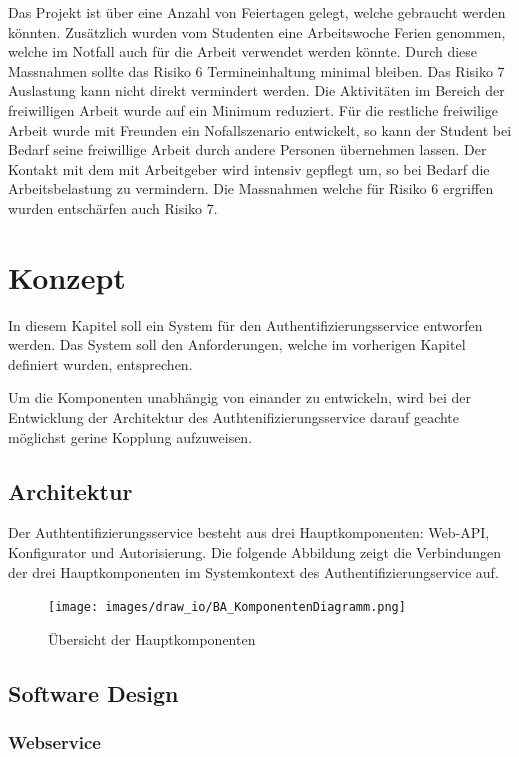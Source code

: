 Das Projekt ist über eine Anzahl von Feiertagen gelegt, welche gebraucht
werden könnten. Zusätzlich wurden vom Studenten eine Arbeitswoche Ferien
genommen, welche im Notfall auch für die Arbeit verwendet werden könnte.
Durch diese Massnahmen sollte das Risiko 6 Termineinhaltung minimal
bleiben. Das Risiko 7 Auslastung kann nicht direkt vermindert werden.
Die Aktivitäten im Bereich der freiwilligen Arbeit wurde auf ein Minimum
reduziert. Für die restliche freiwilige Arbeit wurde mit Freunden ein
Nofallszenario entwickelt, so kann der Student bei Bedarf seine
freiwillige Arbeit durch andere Personen übernehmen lassen. Der Kontakt
mit dem mit Arbeitgeber wird intensiv gepflegt um, so bei Bedarf die
Arbeitsbelastung zu vermindern. Die Massnahmen welche für Risiko 6
ergriffen wurden entschärfen auch Risiko 7.

\chapter{Konzept}\label{konzept}

In diesem Kapitel soll ein System für den Authentifizierungsservice
entworfen werden. Das System soll den Anforderungen, welche im
vorherigen Kapitel definiert wurden, entsprechen.

Um die Komponenten unabhängig von einander zu entwickeln, wird bei der
Entwicklung der Architektur des Authtenifizierungsservice darauf geachte
möglichst gerine Kopplung aufzuweisen.

\section{Architektur}\label{architektur}

Der Authtentifizierungsservice besteht aus drei Hauptkomponenten:
Web-API, Konfigurator und Autorisierung. Die folgende Abbildung zeigt
die Verbindungen der drei Hauptkomponenten im Systemkontext des
Authentifizierungservice auf.

\begin{figure}[htbp]
\centering
\texttt{[image: images/draw\_io/BA\_KomponentenDiagramm.png]}
\caption{Übersicht der Hauptkomponenten}
\end{figure}

\section{Software Design}\label{software-design}

\subsection{Webservice}\label{webservice}

